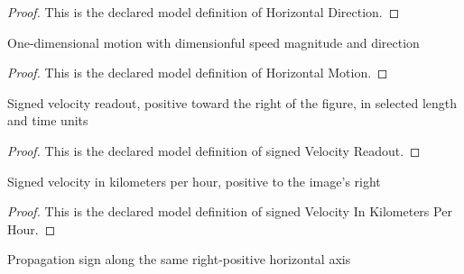 \begin{proof}
  This is the declared model definition of Horizontal Direction.
\end{proof}
\begin{definition}
  \label{def:physics:phyx-mini-0319:phyxminiproblems-problemphyxmini0319-horizontalmotion}
  One-dimensional motion with dimensionful speed magnitude and direction
\end{definition}
\begin{proof}
  This is the declared model definition of Horizontal Motion.
\end{proof}
\begin{definition}
  \label{def:physics:phyx-mini-0319:phyxminiproblems-problemphyxmini0319-signedvelocityreadout}
  Signed velocity readout, positive toward the right of the figure, in selected length and time units
\end{definition}
\begin{proof}
  This is the declared model definition of signed Velocity Readout.
\end{proof}
\begin{definition}
  \label{def:physics:phyx-mini-0319:phyxminiproblems-problemphyxmini0319-signedvelocityinkilometersperhour}
  Signed velocity in kilometers per hour, positive to the image's right
\end{definition}
\begin{proof}
  This is the declared model definition of signed Velocity In Kilometers Per Hour.
\end{proof}
\begin{definition}
  \label{def:physics:phyx-mini-0319:phyxminiproblems-problemphyxmini0319-propagationsign}
  Propagation sign along the same right-positive horizontal axis
\end{definition}

